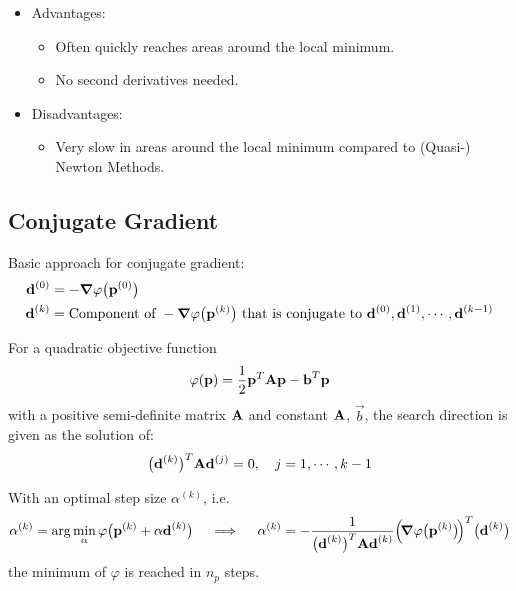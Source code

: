 			\begin{itemize}
				\item Advantages:
					\begin{itemize}
						\item Often quickly reaches areas around the local minimum.
						\item No second derivatives needed.
					\end{itemize}
				\item Disadvantages:
					\begin{itemize}
						\item Very slow in areas around the local minimum compared to (Quasi-) Newton Methods.
					\end{itemize}
			\end{itemize}

		\subsection{Conjugate Gradient}
			Basic approach for conjugate gradient:
			\begin{align*}
				\boldsymbol{\mathrm{d}}^{(0)} &= -\grad{\varphi}\big(\boldsymbol{\mathrm{p}}^{(0)}\big) \\
				\boldsymbol{\mathrm{d}}^{(k)} &= \text{Component of } -\grad{\varphi}\big(\boldsymbol{\mathrm{p}}^{(k)}\big) \text{ that is conjugate to } \boldsymbol{\mathrm{d}}^{(0)}, \boldsymbol{\mathrm{d}}^{(1)}, \cdots, \boldsymbol{\mathrm{d}}^{(k - 1)}
			\end{align*}

			For a quadratic objective function
			\begin{align*}
				\varphi(\boldsymbol{\mathrm{p}}) = \frac{1}{2} \boldsymbol{\mathrm{p}}^T \boldsymbol{\mathrm{A}} \boldsymbol{\mathrm{p}} - \boldsymbol{\mathrm{b}}^T \boldsymbol{\mathrm{p}}
			\end{align*}
			with a positive semi-definite matrix \(\boldsymbol{\mathrm{A}}\) and constant \(\boldsymbol{\mathrm{A}}\), \(\vec{b}\), the search direction is given as the solution of:
			\begin{align*}
				\big(\boldsymbol{\mathrm{d}}^{(k)}\big)^T \boldsymbol{\mathrm{A}} \boldsymbol{\mathrm{d}}^{(j)} = 0,\quad j = 1, \cdots, k - 1
			\end{align*}
			
			With an optimal step size \( \alpha^{(k)} \), i.e.
			\begin{align*}
				\alpha^{(k)} = \arg\min_{\alpha} \varphi\big( \boldsymbol{\mathrm{p}}^{(k)} + \alpha \boldsymbol{\mathrm{d}}^{(k)} \big)
					\quad\implies\quad \alpha^{(k)} = -\frac{1}{\big(\boldsymbol{\mathrm{d}}^{(k)}\big)^T \boldsymbol{\mathrm{A}} \boldsymbol{\mathrm{d}}^{(k)}} \Big(\! \grad{\varphi}\big(\boldsymbol{\mathrm{p}}^{(k)}\big) \!\Big)^T \big(\boldsymbol{\mathrm{d}}^{(k)}\big)
			\end{align*}
			the minimum of \(\varphi\) is reached in \(n_p\) steps.
			
